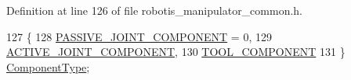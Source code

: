 Definition at line 126 of file robotis\+\_\+manipulator\+\_\+common.\+h.


\begin{DoxyCode}
127 \{
128   \hyperlink{namespacerobotis__manipulator_a2bbf89d1c08dc1d9ff4e28beb939e382a48d9e14bdd971b547f0b4bfcbf8588e7}{PASSIVE\_JOINT\_COMPONENT} = 0,
129   \hyperlink{namespacerobotis__manipulator_a2bbf89d1c08dc1d9ff4e28beb939e382acdf3b34914d1a2a028d882beb96fba7c}{ACTIVE\_JOINT\_COMPONENT},
130   \hyperlink{namespacerobotis__manipulator_a2bbf89d1c08dc1d9ff4e28beb939e382a7d53623544fe889894c54a988f503de0}{TOOL\_COMPONENT}
131 \} \hyperlink{namespacerobotis__manipulator_a0074428cb994a4539fa1c1950d19db4c}{ComponentType};
\end{DoxyCode}

